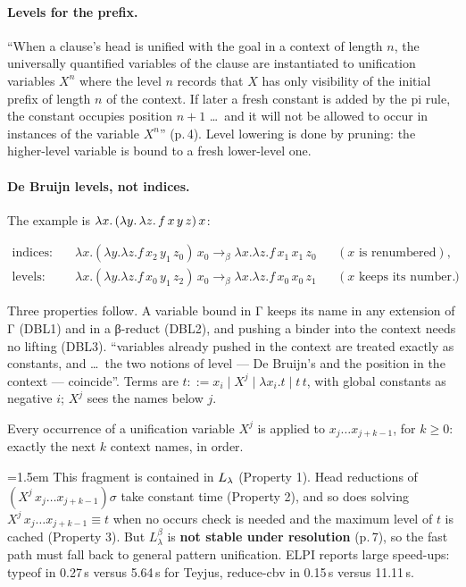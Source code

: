 \paragraph{Levels for the prefix.} \enquote{When a clause's head is unified with the goal in a context
of length $n$, the universally quantified variables of the clause are instantiated to unification
variables $X^n$ where the level $n$ records that $X$ has only visibility of the initial prefix of length
$n$ of the context. If later a fresh constant is added by the pi rule, the constant occupies position
$n+1$ \dots\ and it will not be allowed to occur in instances of the variable $X^n$} (p.\,4). Level
lowering is done by pruning: the higher-level variable is bound to a fresh lower-level one.

\paragraph{De Bruijn levels, not indices.} The example is $\lambda x.\,(\lambda y.\,\lambda z.\,f\,x\,y\,z)\,x$:
\begin{fullwidth}
\begin{align*}
  \text{indices:}\quad& \lambda x.(\lambda y.\lambda z.f\,x_2\,y_1\,z_0)\,x_0\to_\beta\lambda x.\lambda z.f\,x_1\,x_1\,z_0
    && (x \text{ is renumbered}),\\
  \text{levels:}\quad& \lambda x.(\lambda y.\lambda z.f\,x_0\,y_1\,z_2)\,x_0\to_\beta\lambda x.\lambda z.f\,x_0\,x_0\,z_1
    && (x \text{ keeps its number}).
\end{align*}
\end{fullwidth}
\noindent Three properties follow. A variable bound in Γ keeps its name in any extension
of Γ (DBL1) and in a β-reduct (DBL2), and pushing a binder into the context needs no lifting (DBL3).
\enquote{variables already pushed in the context are treated exactly as constants, and \dots\ the two
notions of level --- De Bruijn's and the position in the context --- coincide}. Terms are
$t::=x_i\mid X^j\mid\lambda x_i.t\mid t\,t$, with global constants as negative $i$; $X^j$ sees the names
below $j$.

\begin{definition}
Every occurrence of a unification variable $X^j$ is applied to $x_j\dots x_{j+k-1}$, for $k\ge0$: exactly
the next $k$ context names, in order.
\end{definition}

\noindent\begingroup\emergencystretch=1.5em This fragment is contained in $L_\lambda$ (Property 1). Head reductions of
$(X^j\,x_j\dots x_{j+k-1})\sigma$ take constant time (Property 2), and so does solving
$X^j\,x_j\dots x_{j+k-1}\equiv t$ when no occurs check is needed and the maximum level of $t$ is cached
(Property 3). But $L^\beta_\lambda$ is \textbf{not stable under resolution} (p.\,7), so the fast path
must fall back to general pattern unification. ELPI reports large speed-ups: typeof in 0.27\,s versus
5.64\,s for Teyjus, reduce-cbv in 0.15\,s versus 11.11\,s.\par\endgroup

